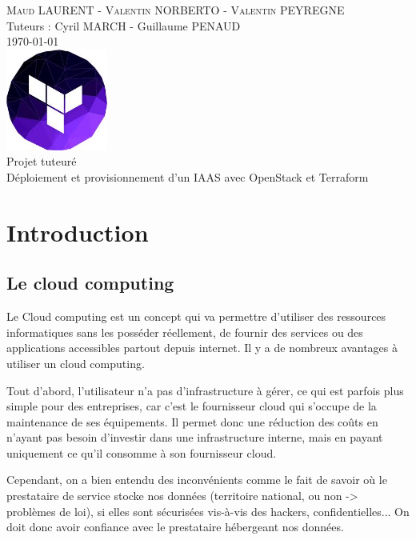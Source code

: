 \documentclass[]{article}
\date{}
\begin{document}
\makeatletter
\begin{titlepage}
\centering
\textsc{Maud LAURENT - Valentin NORBERTO - Valentin PEYREGNE} \\
Tuteurs : Cyril MARCH - Guillaume PENAUD \\
\vspace{1cm}
\textsc{\today}\\
\vspace{5cm}
\includegraphics[width=0.25\textwidth]{Images/download.jpeg} \\
\vspace{1cm}
\Huge{Projet tuteuré \\ Déploiement et provisionnement d’un IAAS avec OpenStack et Terraform}\\
\vfill
\end{titlepage}
\makeatother
\tableofcontents
\newpage
\section{Introduction}\label{introduction}
\subsection{Le cloud computing}\label{le-cloud-computing}
Le Cloud computing est un concept qui va permettre d'utiliser des
ressources informatiques sans les posséder réellement, de fournir des
services ou des applications accessibles partout depuis internet. Il y a
de nombreux avantages à utiliser un cloud computing. 

Tout d'abord, l'utilisateur n'a pas d'infrastructure à gérer, ce qui est parfois plus
simple pour des entreprises, car c'est le fournisseur cloud qui s'occupe
de la maintenance de ses équipements. Il permet donc une réduction des
coûts en n'ayant pas besoin d'investir dans une infrastructure interne,
mais en payant uniquement ce qu'il consomme à son fournisseur cloud.

Cependant, on a bien entendu des inconvénients comme le fait de savoir
où le prestataire de service stocke nos données (territoire national, ou
non -\textgreater{} problèmes de loi), si elles sont sécurisées vis-à-vis des hackers, confidentielles...
On doit donc avoir confiance avec le prestataire hébergeant nos données.
\end{document}
